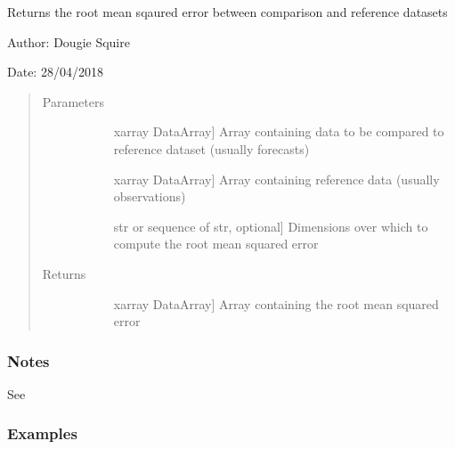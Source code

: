 \documentclass[letterpaper,10pt,english]{sphinxmanual}
\begin{document}
\begin{fulllineitems}
\label{\detokenize{skill_doc:skill.rms_error}}
Returns the root mean sqaured error between comparison and reference datasets

\begin{DUlineblock}{0em}
\item[] Author: Dougie Squire
\item[] Date: 28/04/2018
\end{DUlineblock}
\begin{quote}\begin{description}
\item[{Parameters}] \leavevmode\begin{description}
\item[{}] \leavevmode{[}xarray DataArray{]}
Array containing data to be compared to reference dataset (usually forecasts)

\item[{}] \leavevmode{[}xarray DataArray{]}
Array containing reference data (usually observations)

\item[{}] \leavevmode{[}str or sequence of str, optional{]}
Dimensions over which to compute the root mean squared error

\end{description}

\item[{Returns}] \leavevmode\begin{description}
\item[{}] \leavevmode{[}xarray DataArray{]}
Array containing the root mean squared error

\end{description}

\end{description}\end{quote}
\subsubsection*{Notes}

See 
\subsubsection*{Examples}


\end{fulllineitems}
\end{document}
